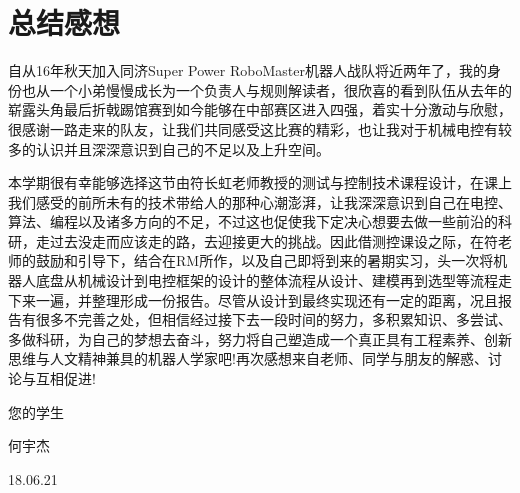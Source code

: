 \newpage
\section{总结感想}

自从16年秋天加入同济Super Power RoboMaster机器人战队将近两年了，我的身份也从一个小弟慢慢成长为一个负责人与规则解读者，很欣喜的看到队伍从去年的崭露头角最后折戟踢馆赛到如今能够在中部赛区进入四强，着实十分激动与欣慰，很感谢一路走来的队友，让我们共同感受这比赛的精彩，也让我对于机械电控有较多的认识并且深深意识到自己的不足以及上升空间。

本学期很有幸能够选择这节由符长虹老师教授的测试与控制技术课程设计，在课上我们感受的前所未有的技术带给人的那种心潮澎湃，让我深深意识到自己在电控、算法、编程以及诸多方向的不足，不过这也促使我下定决心想要去做一些前沿的科研，走过去没走而应该走的路，去迎接更大的挑战。因此借测控课设之际，在符老师的鼓励和引导下，结合在RM所作，以及自己即将到来的暑期实习，头一次将机器人底盘从机械设计到电控框架的设计的整体流程从设计、建模再到选型等流程走下来一遍，并整理形成一份报告。尽管从设计到最终实现还有一定的距离，况且报告有很多不完善之处，但相信经过接下去一段时间的努力，多积累知识、多尝试、多做科研，为自己的梦想去奋斗，努力将自己塑造成一个真正具有工程素养、创新思维与人文精神兼具的机器人学家吧!再次感想来自老师、同学与朋友的解惑、讨论与互相促进!

\begin{flushright}
您的学生

何宇杰

18.06.21
\end{flushright}
